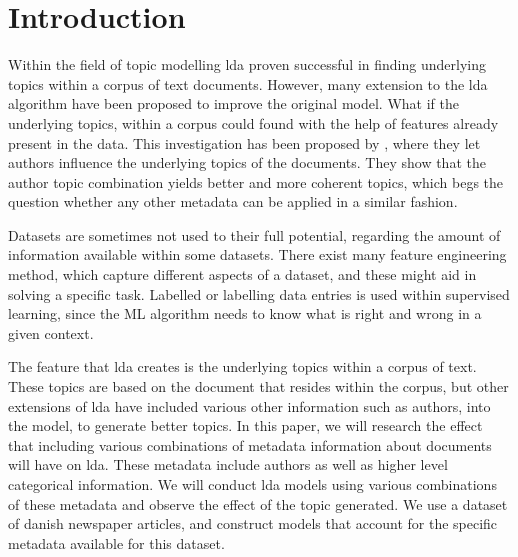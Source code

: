 \section{Introduction}\label{sec:introduction}

Within the field of topic modelling \Gls{lda} proven successful in finding underlying topics within a corpus of text documents.
However, many extension to the \gls{lda} algorithm have been proposed to improve the original model.
What if the underlying topics, within a corpus could found with the help of features already present in the data.
This investigation has been proposed by \citet{author_topic}, where they let authors influence the underlying topics of the documents.
They show that the author topic combination yields better and more coherent topics, which begs the question whether any other metadata can be applied in a similar fashion.

Datasets are sometimes not used to their full potential, regarding the amount of information available within some datasets.
There exist many feature engineering method, which capture different aspects of a dataset, and these might aid in solving a specific task.
Labelled or labelling data entries is used within supervised learning, since the \gls{ML} algorithm needs to know what is right and wrong in a given context.

The feature that \gls{lda} creates is the underlying topics within a corpus of text.
These topics are based on the document that resides within the corpus, but other extensions of \gls{lda} have included various other information such as authors, into the model, to generate better topics.
In this paper, we will research the effect that including various combinations of metadata information about documents will have on \gls{lda}.
These metadata include authors as well as higher level categorical information.
We will conduct \gls{lda} models using various combinations of these metadata and observe the effect of the topic generated.
We use a dataset of danish newspaper articles, and construct models that account for the specific metadata available for this dataset.